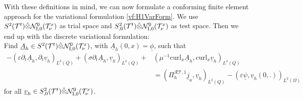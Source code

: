 \documentclass[a4paper,11pt]{article}
\renewcommand{\vec}[1]{\underline{#1}}
\begin{document}
With these definitions in mind, we can now formulate a conforming finite element approach for the variational formulation \eqref{vf:H1VarForm}.  We use $S^2(\mathcal T^t) \hat{\tens}\mathcal N_\mathrm{I,0}^0(\mathcal T^x_\nu)$ as trial space  and $S_{,0}^2(\mathcal T^t) \hat{\tens}\mathcal N_\mathrm{I,0}^0(\mathcal T^x_\nu)$ as test space. Then we end up with the discrete variational formulation:\\
Find $ \vec A_h\in  S^2(\mathcal T^t) \hat{\tens}\mathcal N_\mathrm{I,0}^0(\mathcal T^x_\nu)$, with $\vec A_h(0,x)=\vec \phi$, such that
\begin{align}\label{vf:H1_disc}
	-\left(\varepsilon\partial_t \vec A_h, \partial_t \vec v_h \right)_{L^2(Q)}+\left(\sigma\partial_t \vec A_h, \vec v_h \right)_{L^2(Q)}  +&\left(\mu^{-1}	\mathrm{curl}_x \vec A_h, \mathrm{curl}_x \vec v_h \right)_{L^2(Q)}\\
	\nonumber
	& = \left(\Pi_h^{\mathcal{RT},1} \vec j_a, \vec v_h \right)_{L^2(Q)} - \left(\varepsilon\vec \psi, \vec v_h (0,.)\right)_{L^2(\Omega)}
\end{align}
for all $\vec v_h \in  S_{,0}^2(\mathcal T^t) \hat{\tens}\mathcal N_\mathrm{I,0}^0(\mathcal T^x_\nu)$.
\end{document}
